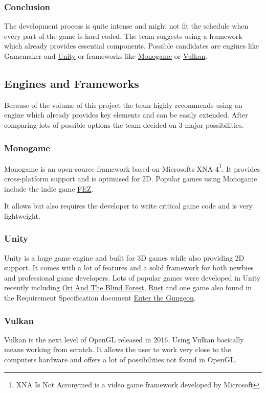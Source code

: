 \documentclass[11pt]{article}
\begin{document}
\subsubsection{Conclusion}
The development process is quite intense and might not fit the schedule when every part of the game is hard coded. The team suggests using a framework which already provides essential components.
Possible candidates are engines like Gamemaker and \hyperref[subsubsec:unity]{Unity} or frameworks like \hyperref[subsubsec:monogame]{Monogame} or \hyperref[subsubsec:vulkan]{Vulkan}.

\subsection{Engines and Frameworks}
Because of the volume of this project the team highly recommends using an engine which already provides key elements and can be easily extended.
After comparing lots of possible options the team decided on 3 major possibilities.

\subsubsection{Monogame}\label{subsubsec:monogame}
Monogame is an open-source framework based on Microsofts XNA-4\footnote{XNA Is Not Acronymed is a video game framework developed by Microsoft}. It provides cross-platform support and is optimised for 2D.
Popular games using Monogame include the indie game \href{http://store.steampowered.com/app/224760/}{FEZ}.

It allows but also requires the developer to write critical game code and is very lightweight.
\subsubsection{Unity}\label{subsubsec:unity}
Unity is a huge game engine and built for 3D games while also providing 2D support. It comes with a lot of features and a solid framework for both newbies and professional game developers.
Lots of popular games were developed in Unity recently including \href{http://www.oriblindforest.com}{Ori And The Blind Forest}, \href{https://playrust.com}{Rust} and one game also found in the Requirement Specification document \href{http://dodgeroll.com/gungeon/}{Enter the Gungeon}.
\subsubsection{Vulkan}\label{subsubsec:vulkan}
Vulkan is the next level of OpenGL released in 2016. Using Vulkan basically means working from scratch. It allows the user to work very close to the computers hardware and offers a lot of possibilities not found in OpenGL.
\end{document}

